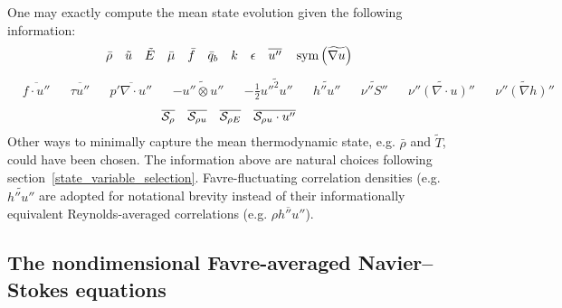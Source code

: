 One may exactly compute the mean state evolution given the following
information:
\begin{align}
&\bar{\rho}
&
&\tilde{u}
&
&\tilde{E}
&
&\bar{\mu}
&
&\bar{f}
&
&\bar{q}_b
&
&k
&
&\epsilon
&
&\overline{u''}
&
&\operatorname{sym}\left(\widetilde{\nabla{}u}\right)
\end{align}
\begin{align}
&\overline{f\cdot{}u''}
&
&\overline{\tau{}u''}
&
&\overline{p'\nabla\cdot{}u''}
&
&-\widetilde{u''\otimes{}u''}
&
&-\frac{1}{2}\widetilde{{u''}^{2}u''}
&
&\widetilde{h''u''}
&
&\widetilde{\nu''S''}
&
&\widetilde{\nu''\left(\nabla\cdot{}u\right)''}
&
&\widetilde{\nu''\left(\nabla{}h\right)''}
\end{align}
\begin{align}
&\overline{\mathcal{S}_{\rho{}}}
&
&\overline{\mathcal{S}_{\rho{} u}}
&
&\overline{\mathcal{S}_{\rho{} E}}
&
&\overline{\mathcal{S}_{\rho{} u}\cdot{}u''}
\end{align}
Other ways to minimally capture the mean thermodynamic state, e.g. $\bar{\rho}$
and $\tilde{T}$, could have been chosen.  The information above are natural
choices following section~\ref{state_variable_selection}.  Favre-fluctuating
correlation densities (e.g.  $\widetilde{h''u''}$ are adopted for notational
brevity instead of their informationally equivalent Reynolds-averaged
correlations (e.g.  $\overline{\rho{}h''u''}$).

\subsection{The nondimensional Favre-averaged Navier--Stokes equations}
\label{sec:nondimfans}

